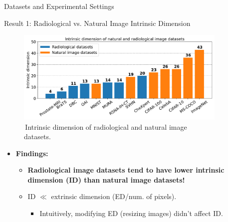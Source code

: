 \documentclass[final,hyperref={pdfpagelabels=false}]{beamer}
\begin{document}
\begin{frame}[t]
\begin{columns}[t]
\begin{column}{.3\textwidth}
\begin{block}{Datasets and Experimental Settings}
\end{block}

\begin{block}{Result 1: Radiological vs. Natural Image Intrinsic Dimension}
\begin{figure}
    \includegraphics[width=0.95\linewidth]{frompaper/modified/ID.pdf}
     \caption{\,Intrinsic dimension of \textcolor{paperblue}{radiological} and \textcolor{paperorange}{natural} \cite{pope2021intrinsic} image datasets.}
\end{figure}

\begin{itemize}
    \item \textbf{Findings:}
    \begin{itemize}
        \item \textbf{Radiological image datasets tend to have lower intrinsic dimension (ID) than natural image datasets!}
        \item ID $\ll$ extrinsic dimension (ED/num. of pixels).
        \begin{itemize}
            \item Intuitively, modifying ED (resizing images) didn't affect ID.
        \end{itemize}
    \end{itemize}
\end{itemize}

\end{block}


\end{column} %

\begin{column}{.03\textwidth}\end{column} %
 
\begin{column}{.3\textwidth} %



\end{column}
\end{columns}
\end{frame}
\end{document}
